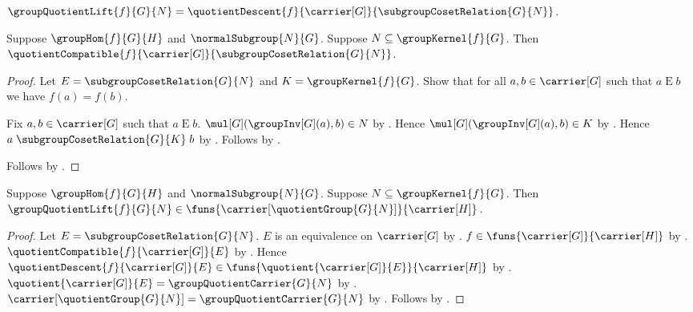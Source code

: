 \begin{definition}\label{group_quotient_lift}
    $\groupQuotientLift{f}{G}{N}=
        \quotientDescent
            {f}{\carrier[G]}{\subgroupCosetRelation{G}{N}}$.
\end{definition}

\begin{proposition}\label{group_quotient_lift_compatible}
    Suppose $\groupHom{f}{G}{H}$ and $\normalSubgroup{N}{G}$.
    Suppose $N\subseteq\groupKernel{f}{G}$.
    Then
        $\quotientCompatible
            {f}{\carrier[G]}{\subgroupCosetRelation{G}{N}}$.
\end{proposition}
\begin{proof}
    Let $E=\subgroupCosetRelation{G}{N}$ and
        $K=\groupKernel{f}{G}$.
    Show that for all $a,b\in\carrier[G]$ such that
        $a\mathrel{E}b$ we have $f(a)=f(b)$.
    \begin{subproof}
        Fix $a,b\in\carrier[G]$ such that $a\mathrel{E}b$.
        $\mul[G](\groupInv[G](a),b)\in N$ by
            .
        Hence $\mul[G](\groupInv[G](a),b)\in K$ by
            .
        Hence
            $a\mathrel{\subgroupCosetRelation{G}{K}}b$ by
            .
        Follows by .
    \end{subproof}
    Follows by .
\end{proof}

\begin{proposition}\label{group_quotient_lift_type}
    Suppose $\groupHom{f}{G}{H}$ and $\normalSubgroup{N}{G}$.
    Suppose $N\subseteq\groupKernel{f}{G}$.
    Then $\groupQuotientLift{f}{G}{N}\in
        \funs{\carrier[\quotientGroup{G}{N}]}{\carrier[H]}$.
\end{proposition}
\begin{proof}
    Let $E=\subgroupCosetRelation{G}{N}$.
    $E$ is an equivalence on $\carrier[G]$ by
        .
    $f\in\funs{\carrier[G]}{\carrier[H]}$ by
        .
    $\quotientCompatible{f}{\carrier[G]}{E}$ by
        .
    Hence $\quotientDescent{f}{\carrier[G]}{E}\in
        \funs{\quotient{\carrier[G]}{E}}{\carrier[H]}$ by
        .
    $\quotient{\carrier[G]}{E}=\groupQuotientCarrier{G}{N}$ by
        .
    $\carrier[\quotientGroup{G}{N}]=
        \groupQuotientCarrier{G}{N}$ by
        .
    Follows by .
\end{proof}

